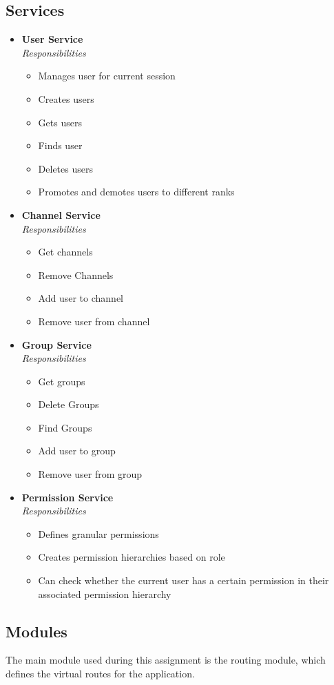 \documentclass[11pt, conference,letterpaper]{IEEEtran}
\begin{document}
\subsection{Services}
\begin{itemize}
    \item \textbf{User Service}
    \\\textit{Responsibilities}
    \begin{itemize}
        \item Manages user for current session
        \item Creates users
        \item Gets users
        \item Finds user
        \item Deletes users
        \item Promotes and demotes users to different ranks
    \end{itemize}
    \item \textbf{Channel Service}
    \\\textit{Responsibilities}
    \begin{itemize}
        \item Get channels
        \item Remove Channels
        \item Add user to channel
        \item Remove user from channel
    \end{itemize}
    \item \textbf{Group Service}
    \\\textit{Responsibilities}
    \begin{itemize}
        \item Get groups
        \item Delete Groups
        \item Find Groups
        \item Add user to group
        \item Remove user from group
    \end{itemize}
    \item \textbf{Permission Service}
    \\\textit{Responsibilities}
    \begin{itemize}
        \item Defines granular permissions
        \item Creates permission hierarchies based on role
        \item Can check whether the current user has a certain permission in their associated permission hierarchy
    \end{itemize}
\end{itemize}

\subsection{Modules}
\par The main module used during this assignment is the routing module, which defines the virtual routes for the application.

%
%
\end{document}
